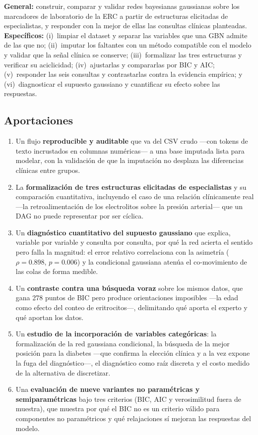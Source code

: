 \documentclass[11pt, a4paper]{article}
\begin{document}
\textbf{General:} construir, comparar y validar redes bayesianas gaussianas sobre los marcadores
de laboratorio de la ERC a partir de estructuras elicitadas de especialistas, y responder con la
mejor de ellas las consultas clínicas planteadas. \textbf{Específicos:} (i)~limpiar el dataset y
separar las variables que una GBN admite de las que no; (ii)~imputar los faltantes con un método
compatible con el modelo y validar que la señal clínica se conserve; (iii)~formalizar las tres
estructuras y verificar su aciclicidad; (iv)~ajustarlas y compararlas por BIC y AIC;
(v)~responder las seis consultas y contrastarlas contra la evidencia empírica; y (vi)~diagnosticar
el supuesto gaussiano y cuantificar su efecto sobre las respuestas.

\subsection{Aportaciones}

\begin{enumerate}
    \item Un flujo \textbf{reproducible y auditable} que va del CSV crudo —con tokens de texto
        incrustados en columnas numéricas— a una base imputada lista para modelar, con la
        validación de que la imputación no desplaza las diferencias clínicas entre grupos.
    \item La \textbf{formalización de tres estructuras elicitadas de especialistas} y su
        comparación cuantitativa, incluyendo el caso de una relación clínicamente real —la
        retroalimentación de los electrolitos sobre la presión arterial— que un DAG no puede
        representar por ser cíclica.
    \item Un \textbf{diagnóstico cuantitativo del supuesto gaussiano} que explica, variable por
        variable y consulta por consulta, por qué la red acierta el sentido pero falla la
        magnitud: el error relativo correlaciona con la asimetría
        ($\rho = 0.898$, $p = 0.006$) y la condicional gaussiana atenúa el co-movimiento de las
        colas de forma medible.
    \item Un \textbf{contraste contra una búsqueda voraz} sobre los mismos datos, que gana 278
        puntos de BIC pero produce orientaciones imposibles —la edad como efecto del conteo de
        eritrocitos—, delimitando qué aporta el experto y qué aportan los datos.
    \item Un \textbf{estudio de la incorporación de variables categóricas}: la formalización de la
        red gaussiana condicional, la búsqueda de la mejor posición para la diabetes —que confirma
        la elección clínica y a la vez expone la fuga del diagnóstico—, el diagnóstico como raíz
        discreta y el costo medido de la alternativa de discretizar.
    \item Una \textbf{evaluación de nueve variantes no paramétricas y semiparamétricas} bajo tres
        criterios (BIC, AIC y verosimilitud fuera de muestra), que muestra por qué el BIC no es un
        criterio válido para componentes no paramétricos y qué relajaciones sí mejoran las
        respuestas del modelo.
\end{enumerate}
\end{document}
